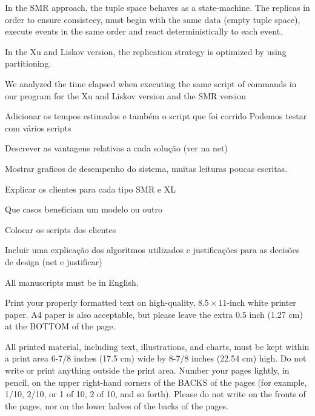 \documentclass[times, 10pt,two column]{article}
\begin{document}
In the SMR approach, the tuple space behaves as a state-machine. The replicas in order to ensure consistecy, must begin with the same data (empty tuple space), execute events in the same order and react deterministically to each event.

In the Xu and Liskov version, the replication strategy is optimized by using partitioning.

We analyzed the time elapsed when executing the same script of commands in our program for the Xu and Liskov version and the SMR version

Adicionar os tempos estimados e também o script que foi corrido
Podemos testar com vários scripts

 
 


Descrever as vantagens relativas a cada solu\c{c}\~ao (ver na net)

Mostrar graficos de desempenho do sistema, muitas leituras poucas escritas.

Explicar os clientes para cada tipo SMR e XL

Que casos beneficiam um modelo ou outro

Colocar os scripts dos clientes

Incluir uma explica\c{c}\~ao dos algoritmos utilizados e justifica\c{c}\~oes para as decis\~oes de design (net e justificar)



All manuscripts must be in English.


Print your properly formatted text on high-quality, $8.5 \times 11$-inch 
white printer paper. A4 paper is also acceptable, but please leave the 
extra 0.5 inch (1.27 cm) at the BOTTOM of the page.


All printed material, including text, illustrations, and charts, must be 
kept within a print area 6-7/8 inches (17.5 cm) wide by 8-7/8 inches 
(22.54 cm) high. Do not write or print anything outside the print area. 
Number your pages lightly, in pencil, on the upper right-hand corners of 
the BACKS of the pages (for example, 1/10, 2/10, or 1 of 10, 2 of 10, and 
so forth). Please do not write on the fronts of the pages, nor on the 
lower halves of the backs of the pages.
\end{document}
